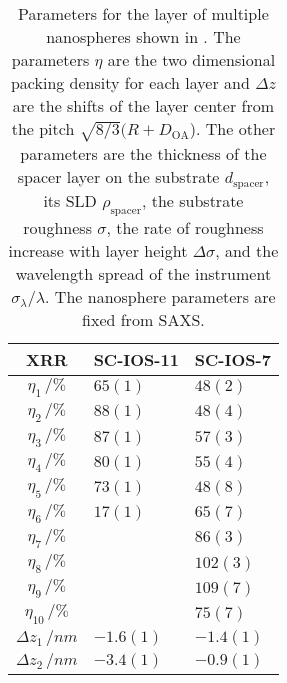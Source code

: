 \documentclass[\main/dresen_thesis.tex]{subfiles}
\begin{document}
  \begin{table}[!htbp]
    \centering
    \caption{\label{tab:looselyPackedNP:nanoparticle:xrr}Parameters for the layer of multiple nanospheres shown in . The parameters $\eta$ are the two dimensional packing density for each layer and $\Delta z$ are the shifts of the layer center from the pitch $\sqrt{8/3} (R+D_\mathrm{OA}$). The other parameters are the thickness of the spacer layer on the substrate $d_\mathrm{spacer}$, its SLD $\rho_\mathrm{spacer}$, the substrate roughness $\sigma$, the rate of roughness increase with layer height $\Delta \sigma$, and the wavelength spread of the instrument $\sigma_\lambda / \lambda$. The nanosphere parameters are fixed from SAXS.}
    \begin{tabular}{ c | l | l }
      \rule{0pt}{2ex} \textbf{XRR}  & \textbf{SC-IOS-11} & \textbf{SC-IOS-7} \\
      \hline
       $\eta_1     \, / \unit{\%}$                                  & $65(1)$         & $48(2)$    \\
       $\eta_2     \, / \unit{\%}$                                  & $88(1)$         & $48(4)$    \\
       $\eta_3     \, / \unit{\%}$                                  & $87(1)$         & $57(3)$    \\
       $\eta_4     \, / \unit{\%}$                                  & $80(1)$         & $55(4)$    \\
       $\eta_5     \, / \unit{\%}$                                  & $73(1)$         & $48(8)$    \\
       $\eta_6     \, / \unit{\%}$                                  & $17(1)$         & $65(7)$    \\
       $\eta_7     \, / \unit{\%}$                                  &                 & $86(3)$    \\
       $\eta_8     \, / \unit{\%}$                                  &                 & $102(3)$    \\
       $\eta_9     \, / \unit{\%}$                                  &                 & $109(7)$    \\
       $\eta_{10}     \, / \unit{\%}$                               &                 & $75(7)$    \\
       \hline
       $\Delta z_1 \, / \unit{nm} $                                 & $-1.6(1)$        & $-1.4(1)$ \\
       $\Delta z_2 \, / \unit{nm} $                                 & $-3.4(1)$        & $-0.9(1)$ \\

\end{tabular}
\end{table}
\end{document}
